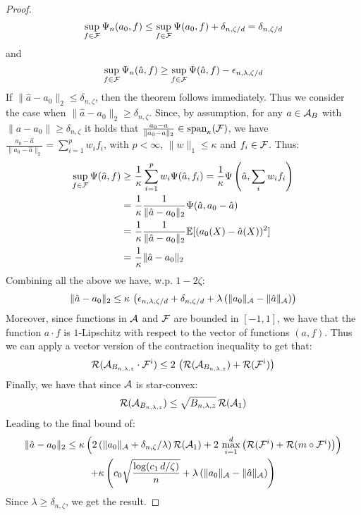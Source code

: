 \begin{proof}
\begin{equation}
    \sup_{f\in {\mathcal F}} \Psi_n(a_0, f) \leq \sup_{f\in {\mathcal F}} \Psi(a_0, f) + \delta_{n,\zeta/d} = \delta_{n,\zeta/d}
\end{equation}
and
\begin{equation}
    \sup_{f\in {\mathcal F}} \Psi_n(\hat{a}, f) \geq \sup_{f\in {\mathcal F}} \Psi(\hat{a}, f) - \epsilon_{n,\lambda, \zeta/d}
\end{equation}
If $\|\hat{a}-a_0\|_2\leq \delta_{n,\zeta}$, then the theorem follows immediately. Thus we consider the case when $\|\hat{a}-a_0\|_2\geq \delta_{n,\zeta}$. Since, by assumption, for any $a\in {\mathcal A}_{B}$ with $\|a-a_0\|\geq \delta_{n,\zeta}$ it holds that $\frac{a_0-a}{\|a_0-a\|_2}\in \text{span}_{\kappa}({\mathcal F})$, we have $\frac{a_0 -\hat{a}}{\|a_0 - \hat{a}\|_2}=\sum_{i=1}^p w_i f_i$, with $p<\infty$, $\|w\|_1\leq \kappa$ and $f_i\in {\mathcal F}$. Thus:
\begin{align}
    \sup_{f\in {\mathcal F}} \Psi(\hat{a}, f) \geq~& \frac{1}{\kappa} \sum_{i=1}^p w_i \Psi(\hat{a}, f_i) = \frac{1}{\kappa} \Psi\left(\hat{a}, \sum_i w_i f_i\right)\\
    =~& \frac{1}{\kappa} \frac{1}{\|\hat{a}-a_0\|_2}\Psi(\hat{a}, a_0 - \hat{a})\\
    =~& \frac{1}{\kappa} \frac{1}{\|\hat{a}-a_0\|_2}\mathbb{E}[(a_0(X) - \hat{a}(X))^2]\\
    =~& \frac{1}{\kappa} \|\hat{a}-a_0\|_2
\end{align}
Combining all the above we have, w.p. $1-2\zeta$:
\begin{equation}
    \|\hat{a}-a_0\|_2 \leq \kappa\, \left(\epsilon_{n, \lambda, \zeta/d} + \delta_{n,\zeta/d} + \lambda \left(\|a_0\|_{{\mathcal A}} - \|\hat{a}\|_{{\mathcal A}}\right)\right)
\end{equation}
Moreover, since functions in ${\mathcal A}$ and ${\mathcal F}$ are bounded in $[-1,1]$, we have that the function $a\cdot f$ is $1$-Lipschitz with respect to the vector of functions $(a, f)$. Thus we can apply a vector version of the contraction inequality \cite{maurer2016vector} to get that:
\begin{equation}
{\mathcal R}({\mathcal A}_{B_{n,\lambda, z}}\cdot {\mathcal F}^i) \leq 2\, \left({\mathcal R}({\mathcal A}_{B_{n,\lambda, z}}) + {\mathcal R}({\mathcal F}^i)\right)
\end{equation}
Finally, we have that since ${\mathcal A}$ is star-convex:
\begin{equation}
    {\mathcal R}({\mathcal A}_{B_{n,\lambda, z}}) \leq \sqrt{B_{n,\lambda, z}}\,{\mathcal R}({\mathcal A}_1)
\end{equation}
Leading to the final bound of:
\begin{multline}
    \|\hat{a}-a_0\|_2 \leq \kappa \left( 2\left(\|a_0\|_{{\mathcal A}} + \delta_{n,\zeta}/\lambda\right) {\mathcal R}({\mathcal A}_1) + 2\, \max_{i=1}^d \left({\mathcal R}({\mathcal F}^i) + {\mathcal R}(m\circ {\mathcal F}^i)\right) \right)\\ + \kappa \left(c_0\sqrt{\frac{\log(c_1\, d/\zeta)}{n}} + \lambda \left(\|a_0\|_{{\mathcal A}}-\|\hat{a}\|_{{\mathcal A}}\right)\right)
\end{multline}
Since $\lambda \geq \delta_{n,\zeta}$, we get the result.
\end{proof}

